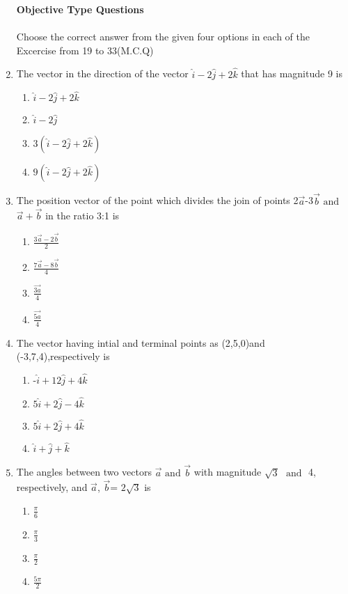 \documentclass{article}
\begin{document}
\begin{enumerate}
\textbf{Objective Type Questions}\\
\\
Choose the correct answer from the given four options in each of the Excercise from 19 to 33(M.C.Q)
\item The vector in the direction of the vector $\hat{i}-2\hat{j}+2\hat{k}$ that has magnitude 9 is
	\begin{enumerate}
\item $\hat{i}-2\hat{j}+2\hat{k}$
\item $\hat{i}-2\hat{j}$
\item $3(\hat{i}-2\hat{j}+2\hat{k})$
\item $9(\hat{i}-2\hat{j}+2\hat{k})$
\end{enumerate}


\item The position vector of the point which divides the join of points 2$\vec{a}$-3$\vec{b}$ $\text{and}$ $\vec{a}+\vec{b}$ in the ratio 3:1 is
	\begin{enumerate}
\item $\frac{3\vec{a}-2\vec{b}}{2}$
\item $\frac{7\vec{a}-8\vec{b}}{4}$
\item $\frac{\vec{3a}}{4}$
\item $\frac{\vec{5a}}{4}$
\end{enumerate}



\item The vector having intial and terminal points as (2,5,0)and (-3,7,4),respectively is
	\begin{enumerate}
\item -$\hat{i}+12\hat{j}+4\hat{k}$
\item $5\hat{i}+2\hat{j}-4\hat{k}$
\item $5\hat{i}+2\hat{j}+4\hat{k}$
\item $\hat{i}+\hat{j}+\hat{k}$
\end{enumerate}


\item The angles between two vectors $\vec{a}$ $\text{and}$ $\vec{b}$ with magnitude $\sqrt{3}$ $\text{ and }$ 4, respectively, and $\vec{a}$, $\vec{b}$= $2\sqrt{3}$ is
	\begin{enumerate}
\item $\frac{\pi}{6}$
\item $\frac{\pi}{3}$
\item $\frac{\pi}{2}$ 
\item $\frac{5\pi}{2}$
\end{enumerate}


\end{enumerate}
\end{document}
